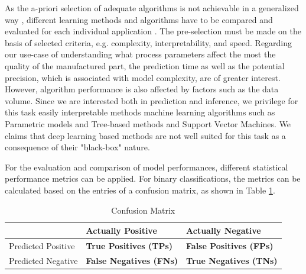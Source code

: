 As the a-priori selection of adequate algorithms is not achievable in a generalized way \citep{kotthoff2016algorithm}, different learning methods and algorithms have to be compared and evaluated for each individual application \citep{lee2020machine}. The pre-selection must be made on the basis of selected criteria, e.g. complexity, interpretability, and speed. 
Regarding our use-case of understanding what process parameters affect the most the quality of the manufactured part, the prediction time as well as the potential precision, which is associated with model complexity, are of greater interest. However, algorithm performance is also affected by factors such as the data volume. Since we are interested both in prediction and inference, we privilege for this task easily interpretable methods machine learning algorithms such as Parametric models and Tree-based methods and Support Vector Machines. We claims that deep  learning based methods are not well suited for this task as a consequence of their "black-box" nature.

For the evaluation and comparison of model performances, different statistical performance metrics can be applied. For binary classifications, the metrics can be calculated based on the entries of a confusion matrix, as shown in Table \ref{tab:confusion_matrix}.

\begin{table}[]
\label{tab:confusion_matrix}
\begin{tabular}{l|l|l|}
\cline{2-3}
                                         & Actually Positive              & Actually Negative              \\ \hline
\multicolumn{1}{|l|}{Predicted Positive} & \textbf{True Positives (TPs)}  & \textbf{False Positives (FPs)} \\ \hline
\multicolumn{1}{|l|}{Predicted Negative} & \textbf{False Negatives (FNs)} & \textbf{True Negatives (TNs)}  \\ \hline
\end{tabular}
\caption{Confusion Matrix}
\end{table}

